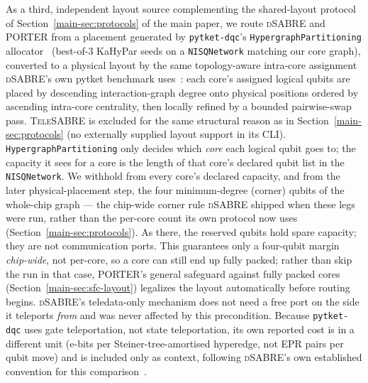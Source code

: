 \documentclass[journal]{IEEEtran}
\newcommand{\PORTER}{\textsc{PORTER}}
\newcommand{\TeleSABRE}{\textsc{TeleSABRE}}
\newcommand{\dSABRE}{\textsc{dSABRE}}
\newcommand{\mainInitialLayout}{Section~\ref{main-sec:sfc-layout}}
\newcommand{\mainProtocols}{Section~\ref{main-sec:protocols}}
\begin{document}
As a third, independent layout source complementing the shared-layout
protocol of \mainProtocols{} of the main paper, we route \dSABRE{} and
\PORTER{} from a placement generated by \texttt{pytket-dqc}'s
\texttt{HypergraphPartitioning} allocator~\cite{pytketdqc2024}
(best-of-3 KaHyPar seeds on a \texttt{NISQNetwork} matching our core
graph), converted to a physical layout by the same topology-aware
intra-core assignment \dSABRE{}'s own pytket benchmark
uses~\cite{lidsabre}: each core's assigned logical qubits are placed
by descending interaction-graph degree onto physical positions ordered
by ascending intra-core centrality, then locally refined by a bounded
pairwise-swap pass. \TeleSABRE{} is excluded for the same structural
reason as in \mainProtocols{} (no externally supplied
layout support in its CLI). \texttt{HypergraphPartitioning} only
decides which \emph{core} each logical qubit goes to; the capacity it
sees for a core is the length of that core's declared qubit list in
the \texttt{NISQNetwork}. We withhold from every core's declared capacity, and from the later
physical-placement step, the four minimum-degree (corner) qubits of the
whole-chip graph --- the chip-wide corner rule \dSABRE{} shipped when
these legs were run, rather than the per-core count its own protocol now
uses (\mainProtocols{}). As there, the reserved qubits hold spare
capacity; they are not communication ports. This guarantees only a
four-qubit margin \emph{chip-wide}, not per-core, so a core can still
end up fully packed; rather than skip the run in that case,
\PORTER{}'s general safeguard against fully packed cores
(\mainInitialLayout{}) legalizes the layout automatically
before routing begins. \dSABRE{}'s teledata-only mechanism does not
need a free port on the side it teleports \emph{from} and was never
affected by this precondition. Because \texttt{pytket-dqc} uses gate
teleportation, not state teleportation, its own reported cost is in a
different unit (e-bits per Steiner-tree-amortised hyperedge, not EPR
pairs per qubit move) and is included only as context, following
\dSABRE{}'s own established convention for this
comparison~\cite{lidsabre}.
\end{document}
